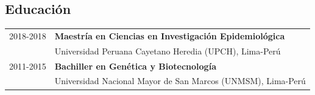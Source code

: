 \documentclass[margin,line]{res}
\begin{document}
\begin{resume}

\section{\sc Educación}

\begin{tabular}{ l l }
	2018-2018 & {\bf Maestría en Ciencias en Investigación Epidemiológica}\\ %
	& Universidad Peruana Cayetano Heredia (UPCH), Lima-Perú\\
	2011-2015 & {\bf Bachiller en Genética y Biotecnología}\\
	& Universidad Nacional Mayor de San Marcos (UNMSM), Lima-Perú\\
\end{tabular}



\end{resume}
\end{document}
